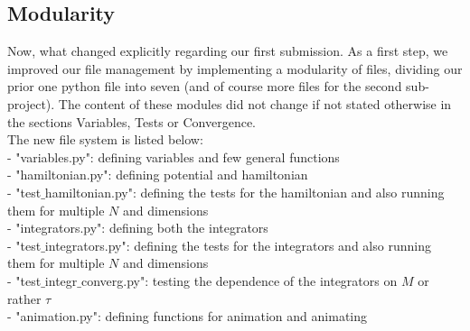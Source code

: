 \documentclass[11pt, letterpaper, onecolumn]{article}
\begin{document}
	\subsection{Modularity}
	Now, what changed explicitly regarding our first submission. As a first step, we improved our file management by implementing a modularity of files, dividing our prior one python file into seven (and of course more files for the second sub-project). The content of these modules did not change if not stated otherwise in the sections Variables, Tests or Convergence. \\
	The new file system is listed below: \\ 
	- "variables.py": defining variables and few general functions\\
	- "hamiltonian.py": defining potential and hamiltonian\\
	- "test$\_$hamiltonian.py": defining the tests for the hamiltonian and also running them for multiple $N$ and dimensions \\
	- "integrators.py": defining both the integrators \\
	- "test$\_$integrators.py": defining the tests for the integrators and also running them for multiple $N$ and dimensions \\
	- "test$\_$integr$\_$converg.py": testing the dependence of the integrators on $M$ or rather $\tau$ \\
	- "animation.py": defining functions for animation and animating
\end{document}
